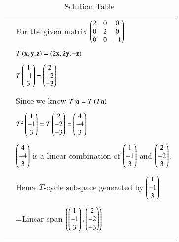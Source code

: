 \documentclass[journal,12pt]{IEEEtran}
\begin{document}
\begin{longtable}{|l|l|}
&For the given matrix  $\begin{pmatrix}2&0&0\\0&2&0\\0&0&-1\end{pmatrix}$\\
&\\
&$T\left(\mathbf{x},\mathbf{y},\mathbf{z}\right)=\left(2\mathbf{x},2\mathbf{y},-\mathbf{z}\right)$\\
&\\
&$T\begin{pmatrix}1\\-1\\3\end{pmatrix}=\begin{pmatrix}2\\-2\\-3\end{pmatrix}$\\
&\\
&Since we know $T^2\mathbf{a}=T\left(T\mathbf{a}\right)$\\
&\\
&$T^2\begin{pmatrix}1\\-1\\3\end{pmatrix}=T\begin{pmatrix}2\\-2\\-3\end{pmatrix}=\begin{pmatrix}4\\-4\\3\end{pmatrix}$\\
&\\
&$\begin{pmatrix}4\\-4\\3\end{pmatrix}$ is a linear combination of $\begin{pmatrix}1\\-1\\3\end{pmatrix}$ and $\begin{pmatrix}2\\-2\\3\end{pmatrix}$.\\
&\\
&Hence $T$-cycle subspace generated by $\begin{pmatrix}1\\-1\\3\end{pmatrix}$\\
&\\
&=Linear span $\left(\begin{pmatrix}1\\-1\\3\end{pmatrix},\begin{pmatrix}2\\-2\\-3\end{pmatrix}\right)$ \\

\hline

\caption{Solution Table}
\label{table:2}
\end{longtable}
\end{document}
